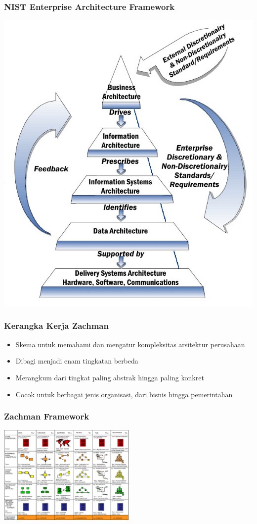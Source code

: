 \documentclass[aspectratio=169, table]{beamer}
\begin{document}
	{
		\begin{frame}
			\frametitle{NIST Enterprise Architecture Framework}
			\begin{center}
				\includegraphics[width=.40\textwidth]{../figures/nist}
			\end{center}
		\end{frame}
	}
	
	\begin{frame}
		\frametitle{Kerangka Kerja Zachman}
		\begin{itemize}
			\item Skema untuk memahami dan mengatur kompleksitas arsitektur perusahaan
			\item Dibagi menjadi enam tingkatan berbeda
			\item Merangkum dari tingkat paling abstrak hingga paling konkret
			\item Cocok untuk berbagai jenis organisasi, dari bisnis hingga pemerintahan
		\end{itemize}
	\end{frame}
	
	{
		\begin{frame}
			\frametitle{Zachman Framework}
			\begin{center}
				\includegraphics[width=0.5\textwidth]{../figures/zachman}
			\end{center}
		\end{frame}
	}
	
\end{document}
